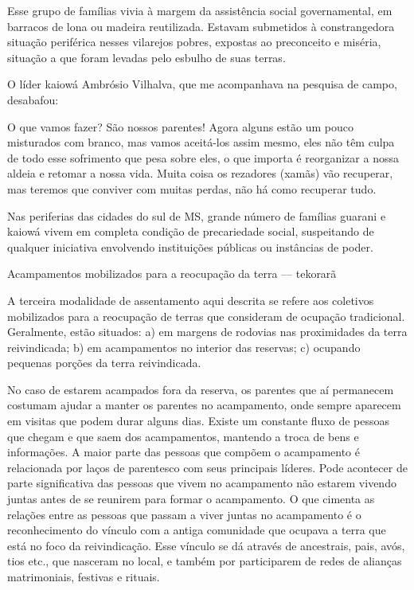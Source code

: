 \documentclass{article}
\begin{document}
Esse grupo de fam\'ilias vivia \`a margem da assist\^encia social
governamental, em barracos de lona ou madeira reutilizada. Estavam
submetidos \`a constrangedora situa\c{c}\~ao perif\'erica nesses
vilarejos pobres, expostas ao preconceito e mis\'eria, situa\c{c}\~ao a
que foram levadas pelo esbulho de suas terras.

O l\'ider kaiow\'a Ambr\'osio Vilhalva, que me acompanhava na pesquisa
de campo, desabafou:

O que vamos fazer? S\~ao nossos parentes! Agora alguns est\~ao um pouco
misturados com branco, mas vamos aceit\'a-los assim mesmo, eles n\~ao
t\^em culpa de todo esse sofrimento que pesa sobre eles, o que importa
\'e reorganizar a nossa aldeia e retomar a nossa vida. Muita coisa os
rezadores (xam\~as) v\~ao recuperar, mas teremos que conviver com
muitas perdas, n\~ao h\'a como recuperar tudo.

Nas periferias das cidades do sul de MS, grande n\'umero de fam\'ilias
guarani e kaiow\'a vivem em completa condi\c{c}\~ao de precariedade
social, suspeitando de qualquer iniciativa envolvendo
institui\c{c}\~oes p\'ublicas ou inst\^ancias de poder. 

Acampamentos mobilizados para a reocupa\c{c}\~ao da terra --- tekorar\~a

A terceira modalidade de assentamento aqui descrita se refere aos
coletivos mobilizados para a reocupa\c{c}\~ao de terras que consideram
de ocupa\c{c}\~ao tradicional. Geralmente, est\~ao situados: a) em
margens de rodovias nas proximidades da terra reivindicada; b) em
acampamentos no interior das reservas; c) ocupando pequenas
por\c{c}\~oes da terra reivindicada. 

No caso de estarem acampados fora da reserva, os parentes que a\'i
permanecem costumam ajudar a manter os parentes no acampamento, onde
sempre aparecem em visitas que podem durar alguns dias. Existe um
constante fluxo de pessoas que chegam e que saem dos acampamentos,
mantendo a troca de bens e informa\c{c}\~oes. A maior parte das pessoas
que comp\~oem o acampamento \'e relacionada por la\c{c}os de parentesco
com seus principais l\'ideres. Pode acontecer de parte significativa
das pessoas que vivem no acampamento n\~ao estarem vivendo juntas antes
de se reunirem para formar o acampamento. O que cimenta as
rela\c{c}\~oes entre as pessoas que passam a viver juntas no
acampamento \'e o reconhecimento do v\'inculo com a antiga comunidade
que ocupava a terra que est\'a no foco da reivindica\c{c}\~ao. Esse
v\'inculo se d\'a atrav\'es de ancestrais, pais, av\'os, tios etc., que
nasceram no local, e tamb\'em por participarem de redes de alian\c{c}as
matrimoniais, festivas e rituais. 
\end{document}
